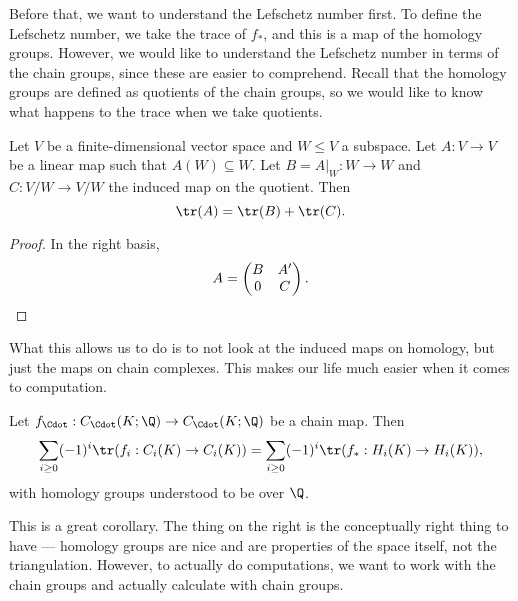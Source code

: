 \documentclass[a4paper]{article}
\begin{document}
Before that, we want to understand the Lefschetz number first. To define the Lefschetz number, we take the trace of $f_*$, and this is a map of the homology groups. However, we would like to understand the Lefschetz number in terms of the chain groups, since these are easier to comprehend. Recall that the homology groups are defined as quotients of the chain groups, so we would like to know what happens to the trace when we take quotients.
\begin{lemma}
  Let $V$ be a finite-dimensional vector space and $W \leq V$ a subspace. Let $A: V\to V$ be a linear map such that $A(W) \subseteq W$. Let $B = A|_W: W \to W$ and $C: V/W \to V/W$ the induced map on the quotient. Then
  \[
    \tr (A) = \tr(B) + \tr(C).
  \]
\end{lemma}

\begin{proof}
  In the right basis,
  \[
    A =
    \begin{pmatrix}
      B & A'\\
      0 & C
    \end{pmatrix}.\qedhere
  \]
\end{proof}

What this allows us to do is to not look at the induced maps on homology, but just the maps on chain complexes. This makes our life much easier when it comes to computation.

\begin{cor}
  Let $f_{\Cdot}: C_{\Cdot}(K; \Q) \to C_{\Cdot}(K; \Q)$ be a chain map. Then
  \[
    \sum_{i \geq 0} (-1)^i \tr(f_i: C_i(K) \to C_i(K)) = \sum_{i \geq 0} (-1)^i \tr(f_*: H_i(K) \to H_i(K)),
  \]
  with homology groups understood to be over $\Q$.
\end{cor}
This is a great corollary. The thing on the right is the conceptually right thing to have --- homology groups are nice and are properties of the space itself, not the triangulation. However, to actually do computations, we want to work with the chain groups and actually calculate with chain groups.
\end{document}
